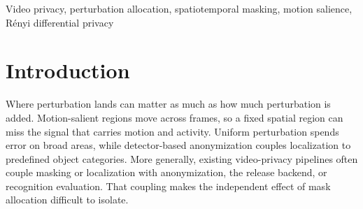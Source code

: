 \providecommand{\toprule}{\hline}
\providecommand{\midrule}{\hline}
\providecommand{\bottomrule}{\hline}

\ninept
\maketitle

\begin{abstract}
Where perturbation lands can matter as much as how much is added. We study
whether mask policy alone can redirect release error toward motion-salient
regions when the release backend is fixed. We introduce region-adaptive token
(RAT) fusion, which combines VideoMAE semantic salience, temporal variation,
Sobel texture, and RAFT flow to allocate block-level perturbations, together
with a same-backend mask-isolation protocol. On a fixed balanced subset of 20
UCF101 videos, RAT beats Random and Shifted fusion on Cover, RawErr, and IncErr
for all 20/20 videos at \(k=20\), with RAT-minus-Random differences of 0.1520,
0.1360, and 0.1486 and RAT-minus-Shifted differences of 0.1718, 0.1522, and
0.1649. The advantage persists across ten master seeds (1,400 successful runs)
and \(k\in\{10,20,30,40\}\), while RAT+traj. is statistically
indistinguishable from RAT. These controlled comparisons show that spatial
alignment, rather than score concentration alone, drives the gain, establishing
mask policy as a controllable design lever for motion-salience-aligned
perturbation allocation. For fixed or external masks, the selected low-frequency
DCT queries additionally admit mask-restricted R\'enyi-DP accounting.
\end{abstract}

\begin{keywords}
Video privacy, perturbation allocation, spatiotemporal masking, motion
salience, R\'enyi differential privacy
\end{keywords}

\section{Introduction}
\label{sec:intro}

Where perturbation lands can matter as much as how much perturbation is added.
Motion-salient regions move across frames, so a fixed spatial region can miss
the signal that carries motion and activity. Uniform perturbation spends error
on broad areas, while detector-based anonymization couples localization to
predefined object categories. More generally, existing video-privacy pipelines
often couple masking or localization with anonymization, the release backend,
or recognition evaluation. That coupling makes the independent effect of mask
allocation difficult to isolate.

